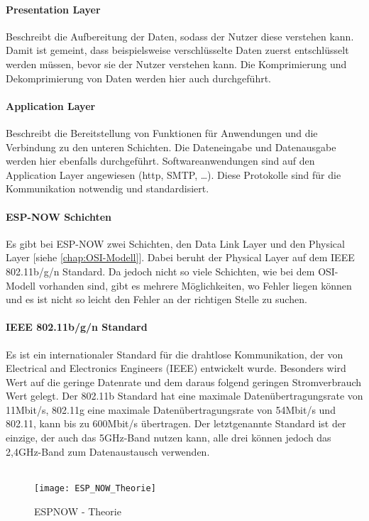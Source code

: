 \documentclass[titlepage,12pt,twoside]{article}
\begin{document}
\paragraph{Presentation Layer}
\label{par:Presentation Layer}
\hfill \break
\hfill \break
Beschreibt die Aufbereitung der Daten, sodass der Nutzer diese verstehen kann. Damit 
ist gemeint, dass beispielsweise verschlüsselte Daten zuerst entschlüsselt werden 
müssen, bevor sie der Nutzer verstehen kann. Die Komprimierung und Dekomprimierung 
von Daten werden hier auch durchgeführt. \\

\paragraph{Application Layer}
\label{par:Application Layer}
\hfill \break
\hfill \break
Beschreibt die Bereitstellung von Funktionen für Anwendungen und die Verbindung zu 
den unteren Schichten. Die Dateneingabe und Datenausgabe werden hier ebenfalls 
durchgeführt. Softwareanwendungen sind auf den Application Layer angewiesen (http, SMTP, …). 
Diese Protokolle sind für die Kommunikation notwendig und standardisiert. \\

\paragraph{ESP-NOW Schichten}
\hfill \break
\hfill \break
Es gibt bei ESP-NOW zwei Schichten, den Data Link Layer und den Physical Layer 
[siehe \textcolor{blue}{\autoref{chap:OSI-Modell}}]. Dabei beruht der Physical Layer auf dem IEEE 802.11b/g/n Standard. 
Da jedoch nicht so viele Schichten, wie bei dem OSI-Modell vorhanden sind, gibt es 
mehrere Möglichkeiten, wo Fehler liegen können und es ist nicht so leicht den Fehler 
an der richtigen Stelle zu suchen. \\

\paragraph{IEEE 802.11b/g/n Standard}
\label{par:802.11b/g/n Standard}
\hfill \break
\hfill \break
Es ist ein internationaler Standard für die drahtlose Kommunikation, der von 
Electrical and Electronics Engineers (IEEE) entwickelt wurde. Besonders wird Wert auf 
die geringe Datenrate und dem daraus folgend geringen Stromverbrauch Wert gelegt. Der 
802.11b Standard hat eine maximale Datenübertragungsrate von 11Mbit/s, 802.11g eine 
maximale Datenübertragungsrate von 54Mbit/s und 802.11, kann bis zu 600Mbit/s übertragen. 
Der letztgenannte Standard ist der einzige, der auch das 5GHz-Band nutzen kann, alle 
drei können jedoch das 2,4GHz-Band zum Datenaustausch verwenden.  \\
\\
\begin{figure}[H]
	\begin{center}
		\scalebox{0.6}
		{\texttt{[image: ESP\_NOW\_Theorie]}}
		\caption{ESPNOW - Theorie}
		\label{fig:ESP_NOW_Theorie}
	\end{center}
\end{figure}
\end{document}
